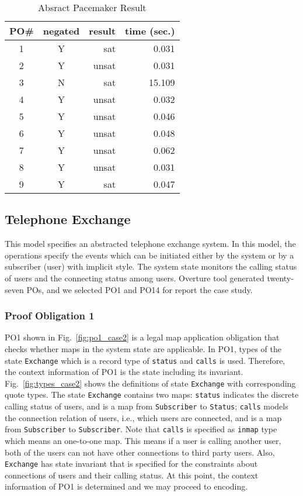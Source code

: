 \begin{table}[htb]
\begin{center}
\begin{tabular}{|c|c|r|r|}
\hline
PO\#	&	negated	&	result	&	time (sec.) \\ \hline
1		&	Y		&	sat		&	0.031 \\ \hline
2		&	Y		&	unsat	&	0.031 \\ \hline
3		&	N		&	sat		&	15.109 \\ \hline
4		&	Y		&	unsat	&	0.032 \\ \hline
5		&	Y		&	unsat	&	0.046 \\ \hline
6		&	Y		&	unsat	&	0.048 \\ \hline
7		&	Y		&	unsat	&	0.062 \\ \hline
8		&	Y		&	unsat	&	0.031 \\ \hline
9		&	Y		&	sat		&	0.047 \\ \hline
\end{tabular}
\end{center}
\caption{Absract Pacemaker Result}
\label{tbl:result1}
\end{table}


\subsection{Telephone Exchange}

This model specifies an abstracted telephone exchange system. In this model, the operations specify the events which can be initiated either by the system or by a subscriber (user) with implicit style. The system state monitors the calling status of users and the connecting status among users. Overture tool generated twenty-seven POs, and we selected PO1 and PO14 for report the case study.

\subsubsection{Proof Obligation 1}

PO1 shown in Fig.~\ref{fig:po1_case2} is a legal map application obligation that checks whether maps in the system state are applicable. In PO1, types of the state {\tt Exchange} which is a record type of {\tt status} and {\tt calls} is used. Therefore, the context information of PO1 is the state including its invariant. Fig.~\ref{fig:types_case2} shows the definitions of state {\tt Exchange} with corresponding quote types. The state {\tt Exchange} contains two maps: {\tt status} indicates the discrete calling status of users, and is a map from {\tt Subscriber} to {\tt Status}; {\tt calls} models the connection relation of users, i.e., which users are connected, and is a map from {\tt Subscriber} to {\tt Subscriber}. Note that {\tt calls} is specified as {\tt inmap} type which means an one-to-one map. This means if a user is calling another user, both of the users can not have other connections to third party users. Also, {\tt Exchange} has state invariant that is specified for the constraints about connections of users and their calling status. At this point, the context information of PO1 is determined and we may proceed to encoding.

